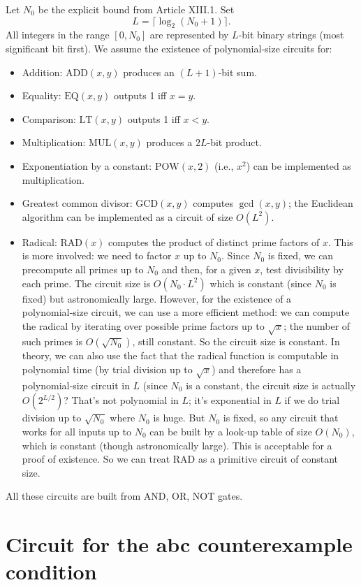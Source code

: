 \documentclass[11pt,a4paper]{article}
\begin{document}
Let $N_0$ be the explicit bound from Article XIII.1. Set
\[
L = \lceil \log_2(N_0+1)\rceil.
\]
All integers in the range $[0,N_0]$ are represented by $L$-bit binary strings (most significant bit first). We assume the existence of polynomial‑size circuits for:
\begin{itemize}
\item Addition: $\mathrm{ADD}(x,y)$ produces an $(L+1)$-bit sum.
\item Equality: $\mathrm{EQ}(x,y)$ outputs 1 iff $x=y$.
\item Comparison: $\mathrm{LT}(x,y)$ outputs 1 iff $x<y$.
\item Multiplication: $\mathrm{MUL}(x,y)$ produces a $2L$-bit product.
\item Exponentiation by a constant: $\mathrm{POW}(x,2)$ (i.e., $x^2$) can be implemented as multiplication.
\item Greatest common divisor: $\mathrm{GCD}(x,y)$ computes $\gcd(x,y)$; the Euclidean algorithm can be implemented as a circuit of size $O(L^2)$.
\item Radical: $\mathrm{RAD}(x)$ computes the product of distinct prime factors of $x$. This is more involved: we need to factor $x$ up to $N_0$. Since $N_0$ is fixed, we can precompute all primes up to $N_0$ and then, for a given $x$, test divisibility by each prime. The circuit size is $O(N_0 \cdot L^2)$ which is constant (since $N_0$ is fixed) but astronomically large. However, for the existence of a polynomial‑size circuit, we can use a more efficient method: we can compute the radical by iterating over possible prime factors up to $\sqrt{x}$; the number of such primes is $O(\sqrt{N_0})$, still constant. So the circuit size is constant. In theory, we can also use the fact that the radical function is computable in polynomial time (by trial division up to $\sqrt{x}$) and therefore has a polynomial‑size circuit in $L$ (since $N_0$ is a constant, the circuit size is actually $O(2^{L/2})$? That's not polynomial in $L$; it's exponential in $L$ if we do trial division up to $\sqrt{N_0}$ where $N_0$ is huge. But $N_0$ is fixed, so any circuit that works for all inputs up to $N_0$ can be built by a look‑up table of size $O(N_0)$, which is constant (though astronomically large). This is acceptable for a proof of existence. So we can treat $\mathrm{RAD}$ as a primitive circuit of constant size.
\end{itemize}
All these circuits are built from AND, OR, NOT gates.

\section{Circuit for the abc counterexample condition}
\end{document}
